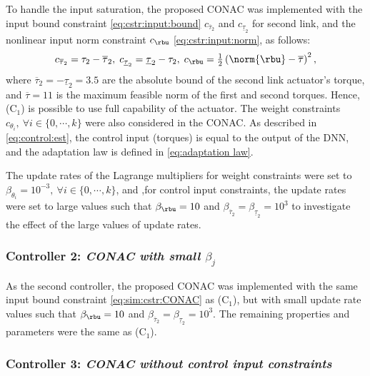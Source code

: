 \documentclass[lettersize,journal]{IEEEtran}
\begin{document}
To handle the input saturation, the proposed CONAC was implemented with the input bound constraint \eqref{eq:cstr:input:bound} $c_{\overline\tau_2}$ and $c_{\underline\tau_2}$ for second link, and the nonlinear input norm constraint $c_{\rbu}$ \eqref{eq:cstr:input:norm}, as follows:
\begin{equation}
    c_{\overline\tau_2}     
    =
    \tau_2-\overline\tau_2
    ,
    \;
    c_{\underline\tau_2} 
    =
    \underline\tau_2-\tau_2
    ,
    \;
    c_{\rbu}
    =
    \tfrac{1}{2}
    \left(
        \norm{\rbu}-\overline\tau
    \right)^2 
    ,
    \label{eq:sim:cstr:CONAC}
\end{equation}
where $\overline\tau_2=-\underline{\tau}_2=3.5$ are the absolute bound of the second link actuator's torque, and $\overline\tau=11$ is the maximum feasible norm of the first and second torques.
Hence, (C$_1$) is possible to use full capability of the actuator.
The weight constraints $c_{\theta_i},\ \forall i\in\{0,\cdots,k\}$ were also considered in the CONAC.
As described in \eqref{eq:control:est}, the control input (torques) is equal to the output of the DNN, and the adaptation law is defined in \eqref{eq:adaptation law}.

The update rates of the Lagrange multipliers for weight constraints were set to $\beta_{\theta_i}=10^{-3},\ \forall i\in\{0,\cdots,k\}$, and ,for control input constraints, the update rates were set to large values such that $\beta_{\rbu}=10$ and $\beta_{\overline{\tau}_2}=\beta_{\underline{\tau}_2}=10^{3}$ to investigate the effect of the large values of update rates.

\subsubsection*{Controller 2:  \textit{CONAC with small $\beta_j$}}

As the second controller, the proposed CONAC was implemented with the same input bound constraint \eqref{eq:sim:cstr:CONAC} as (C$_1$), but with small update rate values such that $\beta_{\rbu}=10$ and $\beta_{\overline{\tau}_2}=\beta_{\underline{\tau}_2}=10^{3}$.
The remaining properties and parameters were the same as (C$_1$).

\subsubsection*{Controller 3:  \textit{CONAC without control input constraints}}
\end{document}
